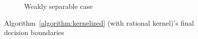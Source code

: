 \begin{figure}[h!]
\begin{subfigure}[b]{0.23\textwidth}
         \caption{Weakly separable case}
    \end{subfigure}
    \captionsetup{justification=centering}
    \caption{Algorithm~\ref{algorithm:kernelized} (with rational kernel)'s final decision boundaries}
    \label{fig:rationalova-points}
\end{figure}
